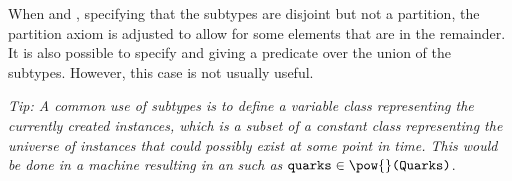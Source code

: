 When  and , specifying that the subtypes are disjoint but not a partition, the partition axiom is adjusted to allow for some elements that are in the remainder.
It is also possible to specify  and  giving a predicate over the union of the subtypes.
However, this case is not usually useful.

\emph{Tip: A common use of subtypes is to define a variable class representing the currently created instances, which is a subset of a constant class representing the universe of instances that could possibly exist at some point in time. 
This would be done in a machine resulting in an}  \emph{such as}  $\code{quarks} \in{}  \pow{} \code{(Quarks)}$.